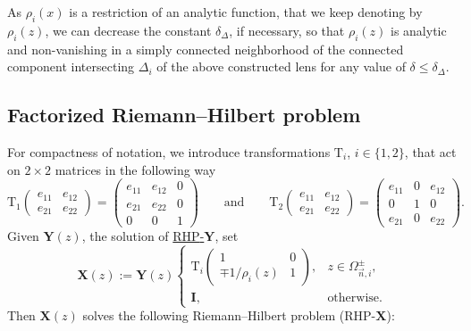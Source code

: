 \documentclass[10pt,a4paper]{amsart}
\numberwithin{equation}{section}
\newcommand{\n}{{\vec n}}
\newcommand{\rhy} {\textnormal{RHP}-${\boldsymbol Y}$}
\newcommand{\rhx} {\textnormal{RHP}-${\boldsymbol X}$}
\begin{document}
As $ \rho_i(x) $ is a restriction of an analytic function, that we keep denoting by $ \rho_i(z) $, we can decrease the constant $ \delta_\Delta $, if necessary, so that $ \rho_i(z) $ is analytic and non-vanishing in a simply connected neighborhood of the connected component intersecting $ \Delta_i $ of the above constructed lens for any value of $ \delta\leq\delta_\Delta $.

\subsection{Factorized Riemann--Hilbert problem}

For compactness of notation, we introduce transformations $\mathrm{T}_i$, $i\in\{1,2\}$, that act on $2\times2$ matrices in the following way
\[
\mathrm{T}_1 \begin{pmatrix} e_{11} & e_{12} \\ e_{21} & e_{22} \end{pmatrix} = \begin{pmatrix} e_{11} & e_{12} & 0 \\ e_{21} & e_{22} & 0 \\ 0 & 0 & 1\end{pmatrix} \qquad \text{and}\qquad  \mathrm{T}_2 \begin{pmatrix} e_{11} & e_{12} \\ e_{21} & e_{22} \end{pmatrix} = \begin{pmatrix} e_{11} & 0 & e_{12} \\ 0 & 1 & 0 \\ e_{21} & 0 & e_{22}\end{pmatrix}.
\]
Given $\boldsymbol Y(z)$, the solution of \hyperref[rhy]{\rhy}, set
\begin{equation}
\label{X}
\boldsymbol X(z):= \boldsymbol Y(z)
\begin{cases}
\mathrm{T}_i \begin{pmatrix} 1 & 0 \\ \mp1/\rho_i(z) & 1 \end{pmatrix}, & z\in \Omega_{\n,i}^{\pm}, \\
\boldsymbol I, & \text{otherwise}.
\end{cases}
\end{equation}
Then $\boldsymbol X(z)$ solves the following Riemann--Hilbert problem (\rhx):
\end{document}
